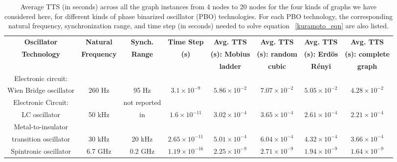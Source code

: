 \documentclass[%
 reprint,
 amsmath,amssymb,
 aps,
]{revtex4-2}
\begin{document}
\begin{table}[t!]
\begin{tabular}{|c|c|c||c|c|c|c|c|} 
 \hline
\textbf{Oscillator} & \textbf{Natural} & \textbf{Synch.} &\textbf{Time Step} &
\textbf{Avg. TTS} & \textbf{Avg. TTS} & \textbf{Avg. TTS} & \textbf{Avg. TTS}
\\
\textbf{Technology} & \textbf{Frequency} & \textbf{Range} &\textbf{(s)} & \textbf{(s): Mobius} & \textbf{(s): random} & \textbf{(s): Erd{\"o}s} & \textbf{(s): complete}\\
\textbf{} & \textbf{} & \textbf{} &\textbf{} & \textbf{ladder} & \textbf{cubic} & \textbf{R{\'e}nyi} & \textbf{graph} \\
\hline
Electronic circuit: &  &  &  &  &  &  & \\
Wien Bridge oscillator \citep{Circuit5}   & 260 Hz \citep{Circuit5} & 95  Hz \citep{Circuit5} & $3.1\times 10^{-9}$   & $5.86 \times 10^{-2}$     & $7.07 \times 10^{-2}$   & $5.05 \times 10^{-2}$   & $4.28 \times 10^{-2}$ \\
\hline
Electronic Circuit: 
&  & not reported  &  &  &  &  & \\
LC oscillator \citep{Circuit3} & 50 kHz \citep{Circuit3} & in \citep{Circuit3} & $1.6\times 10^{-11}$  & $3.02 \times 10^{-4}$     & $3.65 \times 10^{-4}$   & $2.61 \times 10^{-4}$   & $2.21 \times 10^{-4}$ \\
\hline
Metal-to-insulator 
&  &  &  &  &  &  & \\
transition oscillator \citep{MIT1} & 30 kHz \citep{MIT1} & 20 kHz \citep{MIT1} & $2.65\times 10^{-11}$  & $5.01 \times 10^{-4}$     & $6.04 \times 10^{-4}$   & $4.32 \times 10^{-4}$   & $3.66 \times 10^{-4}$ \\
\hline 
Spintronic oscillator \citep{Spin_DB1} & 6.7 GHz \citep{Spin_DB1} & 0.2 GHz \citep{Spin_DB1} & $1.19\times 10^{-16}$  & $2.25 \times 10^{-9}$     & $2.71 \times 10^{-9}$   & $1.94 \times 10^{-9}$   & $1.64 \times 10^{-9}$ \\
\hline
\end{tabular}
\caption{Average TTS (in seconds) across all the graph instances from 4 nodes to 20 nodes for the four kinds of graphs we have considered here, for different kinds of phase binarized oscillator (PBO) technologies. For each PBO technology, the corresponding natural frequency, synchronization range, and time step (in seconds) needed to solve equation ~\ref{kuramoto_eqn} are also listed.}
\label{TTS3}
\end{table}
\end{document}
